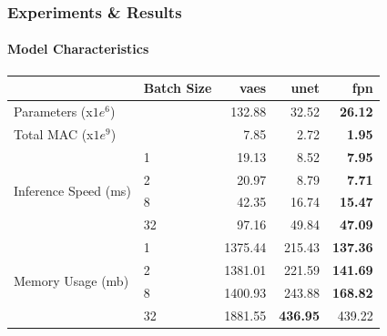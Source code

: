 \documentclass[t,aspectratio=169]{beamer}
\begin{document}
\begin{frame}[fragile]
  \frametitle{Experiments \& Results}
  \framesubtitle{Model Characteristics}
  \vspace*{-0.5cm}
  \begin{table}[ht]
    \centering
    \color{black}
    \begin{tabular}{llrrr}
      \toprule
                                               & Batch Size & vaes    & unet            & fpn             \\
      \midrule
      Parameters (x$1e^6$)                     &            & 132.88  & 32.52           & \textbf{26.12}  \\
      \cline{1-5}
      Total MAC (x$1e^9$)                      &            & 7.85    & 2.72            & \textbf{1.95}   \\
      \cline{1-5}
      \multirow[t]{4}{*}{Inference Speed (ms)} & 1          & 19.13   & 8.52            & \textbf{7.95}   \\
                                               & 2          & 20.97   & 8.79            & \textbf{7.71}   \\
                                               & 8          & 42.35   & 16.74           & \textbf{15.47}  \\
                                               & 32         & 97.16   & 49.84           & \textbf{47.09}  \\
      \cline{1-5}
      \multirow[t]{4}{*}{Memory Usage (mb)}    & 1          & 1375.44 & 215.43          & \textbf{137.36} \\
                                               & 2          & 1381.01 & 221.59          & \textbf{141.69} \\
                                               & 8          & 1400.93 & 243.88          & \textbf{168.82} \\
                                               & 32         & 1881.55 & \textbf{436.95} & 439.22          \\
      \cline{1-5}
      \bottomrule
    \end{tabular}
  \end{table}
  
  
\end{frame}
\end{document}
